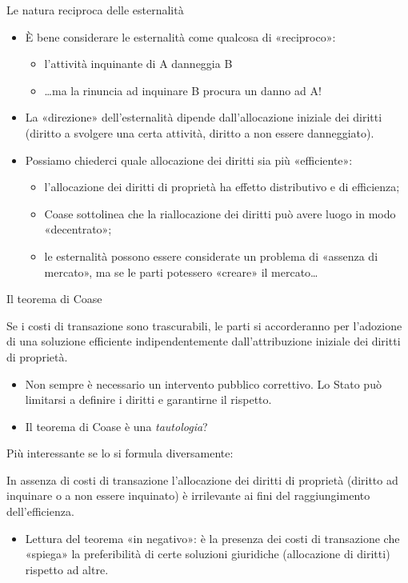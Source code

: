 \documentclass[aspectratio=64,12pt]{beamer}
\begin{document}
\begin{frame}{Le natura reciproca delle esternalità}
\begin{itemize}
\item È bene considerare le esternalità come qualcosa di «reciproco»:
\begin{itemize}
\item l'attività inquinante di A danneggia B
\item \ldots{}ma la rinuncia ad inquinare B procura un danno ad A!
\end{itemize}
\item La «direzione» dell'esternalità dipende dall'allocazione iniziale dei
diritti (diritto a svolgere una certa attività, diritto a non essere
danneggiato).
\item Possiamo chiederci quale allocazione dei diritti sia più «efficiente»:
\begin{itemize}
\item l'allocazione dei diritti di proprietà ha effetto distributivo e di
efficienza;
\item Coase sottolinea che la riallocazione dei diritti può avere luogo in modo
«decentrato»;
\item le esternalità possono essere considerate un problema di «assenza di
mercato», ma se le parti potessero «creare» il mercato\ldots{}
\end{itemize}
\end{itemize}
\end{frame}

\begin{frame}{Il teorema di Coase}
\vspace*{-2mm}
\begin{block}{}
Se i costi di transazione sono trascurabili, le parti si accorderanno per
l'adozione di una soluzione efficiente indipendentemente dall'attribuzione
iniziale dei diritti di proprietà.
\end{block}
\begin{itemize}
\item Non sempre è necessario un intervento pubblico correttivo.  Lo Stato può
limitarsi a definire i diritti e garantirne il rispetto.
\item Il teorema di Coase è una \emph{tautologia}?
\end{itemize}

Più interessante se lo si formula diversamente:
\vspace{-2mm}
\begin{block}{}
In assenza di costi di transazione l'allocazione dei diritti di proprietà
(diritto ad inquinare o a non essere inquinato) è irrilevante ai fini del
raggiungimento dell'efficienza.
\end{block}
\begin{itemize}
\item Lettura del teorema «in negativo»: è la presenza dei costi di transazione
che «spiega» la preferibilità di certe soluzioni giuridiche (allocazione
di diritti) rispetto ad altre.
\end{itemize}
\end{frame}
\end{document}

